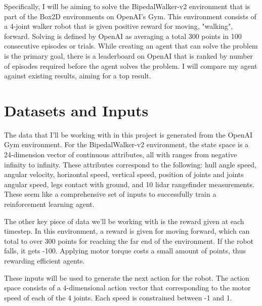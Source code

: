 \documentclass{article}
\begin{document}
\begin{figure}[h]
\end{figure}

Specifically, I will be aiming to solve the BipedalWalker-v2 environment that is part of the Box2D environments on OpenAI's Gym. This environment consists of a 4-joint walker robot that is given positive reward for moving, "walking", forward. Solving is defined by OpenAI as averaging a total 300 points in 100 consecutive episodes or trials. While creating an agent that can solve the problem is the primary goal, there is a leaderboard on OpenAI that is ranked by number of episodes required before the agent solves the problem. I will compare my agent against existing results, aiming for a top result.

\section{Datasets and Inputs}
\label{sec:datasets}
The data that I'll be working with in this project is generated from the OpenAI Gym environment. For the BipedalWalker-v2 environment, the state space is a 24-dimension vector of continuous attributes, all with ranges from negative infinity to infinity. These attributes correspond to the following: hull angle speed, angular velocity, horizontal speed, vertical speed, position of joints and joints angular speed, legs contact with ground, and 10 lidar rangefinder measurements. These seem like a comprehensive set of inputs to successfully train a reinforcement learning agent.  

The other key piece of data we'll be working with is the reward given at each timestep. In this environment, a reward is given for moving forward, which can total to over 300 points for reaching the far end of the environment. If the robot falls, it gets -100. Applying motor torque costs a small amount of points, thus rewarding efficient agents.

These inputs will be used to generate the next action for the robot. The action space consists of a 4-dimensional action vector that corresponding to the motor speed of each of the 4 joints. Each speed is constrained between -1 and 1. 
\end{document}
